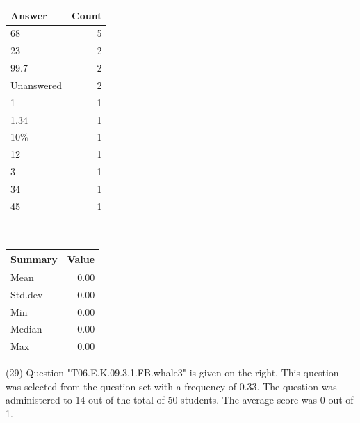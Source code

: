 \documentclass[12pt,english,nohyper]{tufte-handout}\usepackage[]{graphicx}\usepackage[]{color}
\begin{document}
\begin{center}%
\begin{tabular}{lr}
  \hline
Answer & Count \\ 
  \hline
68 &   5 \\ 
  23 &   2 \\ 
  99.7 &   2 \\ 
  Unanswered &   2 \\ 
  1 &   1 \\ 
  1.34 &   1 \\ 
  10\% &   1 \\ 
  12 &   1 \\ 
  3 &   1 \\ 
  34 &   1 \\ 
  45 &   1 \\ 
   \hline
\end{tabular}
~~~~~~~~%
\begin{tabular}{lr}
  \hline
Summary & Value \\ 
  \hline
Mean & 0.00 \\ 
  Std.dev & 0.00 \\ 
  Min & 0.00 \\ 
  Median & 0.00 \\ 
  Max & 0.00 \\ 
   \hline
\end{tabular}
\end{center}\newpage{} (29) Question "T06.E.K.09.3.1.FB.whale3" is given on the right. This question was selected from the question set with a frequency of 0.33. The question was administered to 14 out of the total of 50 students. The average score was 0 out of 1.
\end{document}
